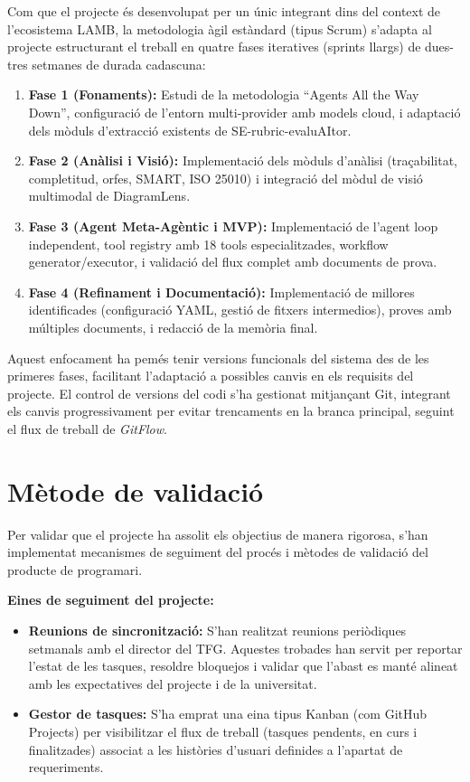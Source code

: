 \documentclass[12pt,a4paper,twoside]{report}
\begin{document}
Com que el projecte \'es desenvolupat per un \'unic integrant dins del context de l'ecosistema LAMB, la metodologia \`agil est\`andard (tipus Scrum) s'adapta al projecte estructurant el treball en quatre fases iteratives (sprints llargs) de dues-tres setmanes de durada cadascuna:

\begin{enumerate}
    \item \textbf{Fase 1 (Fonaments):} Estudi de la metodologia ``Agents All the Way Down'', configuraci\'o de l'entorn multi-provider amb models cloud, i adaptaci\'o dels m\`oduls d'extracci\'o existents de SE-rubric-evaluAItor.
    \item \textbf{Fase 2 (An\`alisi i Visi\'o):} Implementaci\'o dels m\`oduls d'an\`alisi (tra\c{c}abilitat, completitud, orfes, SMART, ISO 25010) i integraci\'o del m\`odul de visi\'o multimodal de DiagramLens.
    \item \textbf{Fase 3 (Agent Meta-Ag\`entic i MVP):} Implementaci\'o de l'agent loop independent, tool registry amb 18 tools especialitzades, workflow generator/executor, i validaci\'o del flux complet amb documents de prova.
    \item \textbf{Fase 4 (Refinament i Documentaci\'o):} Implementaci\'o de millores identificades (configuraci\'o YAML, gesti\'o de fitxers intermedios), proves amb m\'ultiples documents, i redacci\'o de la mem\`oria final.
\end{enumerate}

Aquest enfocament ha pem\'es tenir versions funcionals del sistema des de les primeres fases, facilitant l'adaptaci\'o a possibles canvis en els requisits del projecte. El control de versions del codi s'ha gestionat mitjan\c{c}ant Git, integrant els canvis progressivament per evitar trencaments en la branca principal, seguint el flux de treball de \textit{GitFlow}.

\section{M\`etode de validaci\'o}
\label{sec:metode-validacio}

Per validar que el projecte ha assolit els objectius de manera rigorosa, s'han implementat mecanismes de seguiment del proc\'es i m\`etodes de validaci\'o del producte de programari.

\textbf{Eines de seguiment del projecte:}

\begin{itemize}
    \item \textbf{Reunions de sincronitzaci\'o:} S'han realitzat reunions peri\`odiques setmanals amb el director del TFG. Aquestes trobades han servit per reportar l'estat de les tasques, resoldre bloquejos i validar que l'abast es mant\'e alineat amb les expectatives del projecte i de la universitat.
    \item \textbf{Gestor de tasques:} S'ha emprat una eina tipus Kanban (com GitHub Projects) per visibilitzar el flux de treball (tasques pendents, en curs i finalitzades) associat a les hist\`ories d'usuari definides a l'apartat de requeriments.
\end{itemize}
\end{document}
